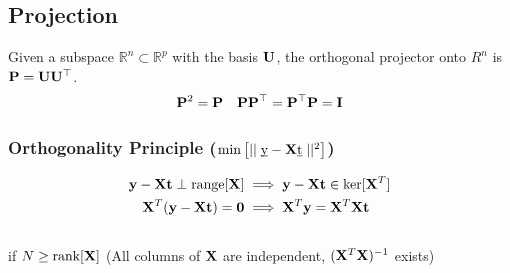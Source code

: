 \begin{mdframed}[style=eqbox]
\subsection{Projection}
Given a subspace $\mathbb R^n \subset \mathbb R^p$ with the basis $\mathbf{U}$, the orthogonal projector onto $R^n$ is $\mathbf{P} = \mathbf{U} \mathbf{U}^\top$.
\vspace*{-6pt}\begin{align*}
  \mathbf{P}^2 = \mathbf{P} && \mathbf{P} \mathbf{P}^\top = \mathbf{P}^\top \mathbf{P} = \mathbf{I}
\end{align*}
\subsubsection{Orthogonality Principle ($\min \left[\mid\mid \underbar{y} - \mathbf{X} \underbar{t} \mid\mid^2\right]$)}
\vspace*{-4pt}
  \begin{align*}
    \mathbf{y} - \mathbf{X}\mathbf{t} \perp \text{range}[\mathbf{X}] &\implies \mathbf{y} - \mathbf{X}\mathbf{t} \in \text{ker}[\mathbf{X}^T]\\
    \mathbf{X}^T(\mathbf{y} - \mathbf{X}\mathbf{t}) = \mathbf{0} &\implies \mathbf{X}^T \mathbf{y} = \mathbf{X}^T \mathbf{X} \mathbf{t}\\
  \end{align*}\vspace*{-24pt}\\
  \small{if $N \geq \text{rank}[\mathbf{X}]$ (All columns of $\mathbf{X}$ are independent, $(\mathbf{X}^T \mathbf{X})^{-1}$ exists)}
\end{mdframed}
%
